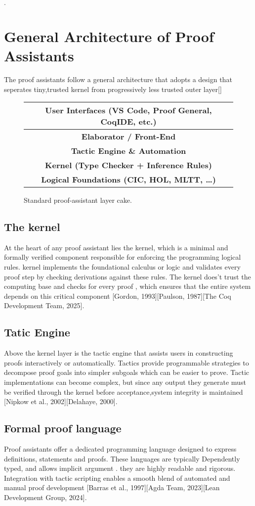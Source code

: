 \documentclass[12pt]{article}
\begin{document}
        .

\section{General Architecture of Proof Assistants}
The proof assistants follow a general architecture that adopts a design that seperates tiny,trusted kernel from progressively less trusted outer layer[]
\begin{figure}[h]
\centering
\begin{tabular}{|c|}
\hline
\textbf{User Interfaces} (VS Code, Proof General, CoqIDE, etc.) \\\hline
\textbf{Elaborator / Front-End}\\
\hline
\textbf{Tactic Engine \& Automation}\\
\hline
\textbf{Kernel (Type Checker + Inference Rules)}\\
\hline
\textbf{Logical Foundations (CIC, HOL, MLTT, …)}\\
\hline
\end{tabular}
\caption{Standard proof-assistant layer cake.}
\label{fig:layers}
\end{figure}


\subsection{The kernel} 
At the heart of any proof assistant lies the kernel, which is a minimal and formally verified component responsible for enforcing the programming logical rules. kernel implements the foundational calculus or logic and validates every proof
step by checking derivations against these rules. The kernel does't trust the computing base and checks for every proof , which ensures that the entire system depends on this critical component [Gordon, 1993][Paulson, 1987][The Coq Development Team, 2025].
\subsection{Tatic Engine}
Above the kernel layer is the tactic engine that assists users in constructing proofs interactively or automatically.
Tactics provide programmable strategies to decompose proof goals into simpler subgoals which can be easier to prove. 
Tactic implementations can become complex, but since any output they generate must be verified through the
kernel before acceptance,system integrity is maintained [Nipkow et al., 2002][Delahaye, 2000]. 


\subsection{Formal proof language}
Proof assistants offer a dedicated programming language designed to express definitions, statements and proofs. These languages are typically Dependently typed,
and allows implicit argument . they are highly readable and rigorous. Integration with tactic scripting enables a smooth blend of automated and manual proof development [Barras et al.,
1997][Agda Team, 2023][Lean Development Group, 2024].
\end{document}
